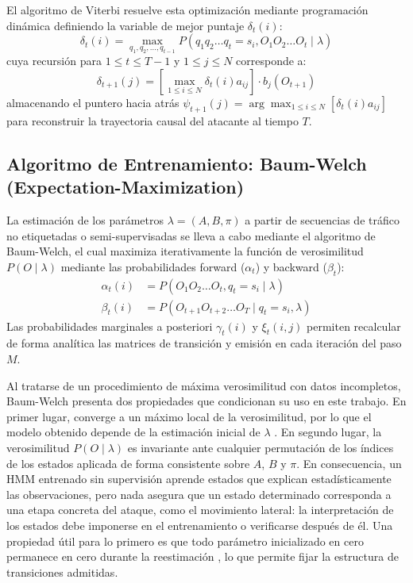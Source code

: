 El algoritmo de Viterbi resuelve esta optimización mediante programación dinámica definiendo la variable de mejor puntaje $\delta_t(i)$:
\begin{equation}
\delta_t(i) = \max_{q_1, q_2, \dots, q_{t-1}} P(q_1 q_2 \dots q_t = s_i, O_1 O_2 \dots O_t \mid \lambda)
\end{equation}
cuya recursión para $1 \le t \le T-1$ y $1 \le j \le N$ corresponde a:
\begin{equation}
\delta_{t+1}(j) = \left[ \max_{1 \le i \le N} \delta_t(i) a_{ij} \right] \cdot b_j(O_{t+1})
\end{equation}
almacenando el puntero hacia atrás $\psi_{t+1}(j) = \arg\max_{1 \le i \le N} [\delta_t(i) a_{ij}]$ para reconstruir la trayectoria causal del atacante al tiempo $T$.

\subsection{Algoritmo de Entrenamiento: Baum-Welch (Expectation-Maximization)}
La estimación de los parámetros $\lambda = (A, B, \pi)$ a partir de secuencias de tráfico no etiquetadas o semi-supervisadas se lleva a cabo mediante el algoritmo de Baum-Welch, el cual maximiza iterativamente la función de verosimilitud $P(O \mid \lambda)$ mediante las probabilidades forward ($\alpha_t$) y backward ($\beta_t$):
\begin{align}
\alpha_t(i) &= P(O_1 O_2 \dots O_t, q_t = s_i \mid \lambda) \\
\beta_t(i) &= P(O_{t+1} O_{t+2} \dots O_T \mid q_t = s_i, \lambda)
\end{align}
Las probabilidades marginales a posteriori $\gamma_t(i)$ y $\xi_t(i, j)$ permiten recalcular de forma analítica las matrices de transición y emisión en cada iteración del paso $M$.

Al tratarse de un procedimiento de máxima verosimilitud con datos incompletos, Baum-Welch presenta dos propiedades que condicionan su uso en este trabajo. En primer lugar, converge a un máximo local de la verosimilitud, por lo que el modelo obtenido depende de la estimación inicial de $\lambda$ \parencite{rabiner1989}. En segundo lugar, la verosimilitud $P(O \mid \lambda)$ es invariante ante cualquier permutación de los índices de los estados aplicada de forma consistente sobre $A$, $B$ y $\pi$. En consecuencia, un HMM entrenado sin supervisión aprende estados que explican estadísticamente las observaciones, pero nada asegura que un estado determinado corresponda a una etapa concreta del ataque, como el movimiento lateral: la interpretación de los estados debe imponerse en el entrenamiento o verificarse después de él. Una propiedad útil para lo primero es que todo parámetro inicializado en cero permanece en cero durante la reestimación \parencite{rabiner1989}, lo que permite fijar la estructura de transiciones admitidas.

